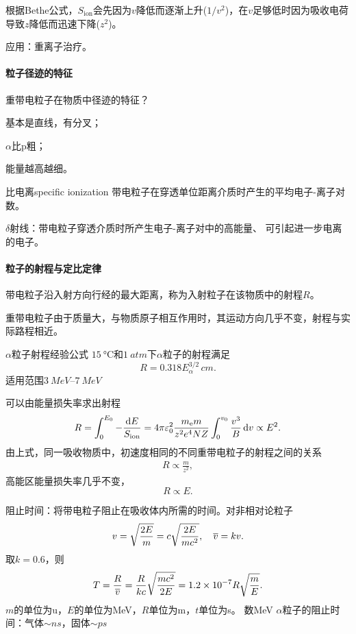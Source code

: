 根据Bethe公式，$S_{\mathrm{ion}}$会先因为$v$降低而逐渐上升($1/v^2$)，在$v$足够低时因为吸收电荷导致$z$降低而迅速下降($z^2$)。

应用：重离子治疗。
\paragraph{粒子径迹的特征}重带电粒子在物质中径迹的特征？
\begin{compactenum}
	\item 基本是直线，有分叉；
	\item $\alpha$比p粗；
	\item 能量越高越细。
\end{compactenum}
\begin{definition}{比电离}{specific ionization}
	带电粒子在穿透单位距离介质时产生的平均电子-离子对数。
\end{definition}
$\delta$射线：带电粒子穿透介质时所产生电子-离子对中的高能量、 可引起进一步电离的电子。
\paragraph{粒子的射程与定比定律}带电粒子沿入射方向行经的最大距离，称为入射粒子在该物质中的射程$R$。

重带电粒子由于质量大，与物质原子相互作用时，其运动方向几乎不变，射程与实际路程相近。

\begin{example}{$\alpha$粒子射程经验公式}{}
	$\SI{15}{\celsius}$和$\SI{1}{atm}$下$\alpha$粒子的射程满足
	\[
		R=0.318E_\alpha^{3/2}\,\si{cm}.
	\]
	适用范围$\SIrange{3}{7}{MeV}$
\end{example}
可以由能量损失率求出射程
\begin{align}
	R=\int_0^{E_0}-\frac{\mathop{}\!\mathrm{d} E}{S_{\mathrm{ion}}}=4\pi\varepsilon_0^2\frac{m_\mathrm e m}{z^2e^4NZ}\int_0^{v_0}\frac{v^3}B\mathop{}\!\mathrm{d} v\propto E^2.
\end{align}
由上式，同一吸收物质中，初速度相同的不同重带电粒子的射程之间的关系
\begin{align}
	R\propto\frac{m}{z^2},%
\end{align}
高能区能量损失率几乎不变，
\[
	R\propto E.
\]



阻止时间：将带电粒子阻止在吸收体内所需的时间。对非相对论粒子
\[
	v=\sqrt{\frac{2E}{m}}=c\sqrt{\frac{2E}{mc^2}},\quad\overline{v}=kv.
\]
取$k=0.6$，则
\[
	T=\frac{R}{\overline{v}}=\frac{R}{kc}\sqrt{\frac{mc^2}{2E}}=\num{1.2e-7}R\sqrt{\frac{m}E}.
\]
$m$的单位为u，$E$的单位为MeV，$R$单位为m，$t$单位为s。
数MeV $\alpha$粒子的阻止时间：气体$\sim\si{ns}$，固体$\sim\si{ps}$
